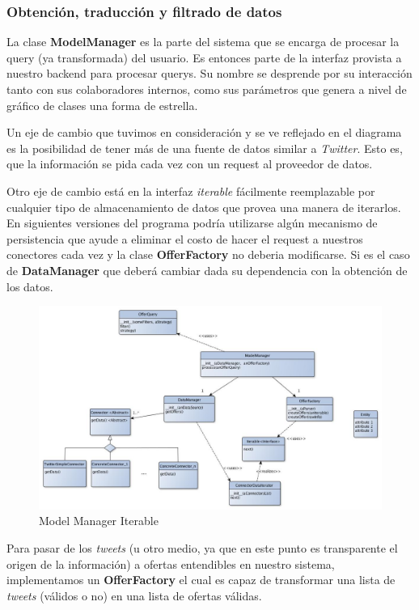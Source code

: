 \documentclass[10pt, a4paper]{article}
\begin{document}
\subsubsection{Obtenci\'on, traducci\'on y filtrado de datos}
La clase \textbf{ModelManager} es la parte del sistema que se encarga de procesar la query (ya transformada) del usuario. Es entonces parte de la interfaz provista a nuestro backend para procesar querys. Su nombre se desprende por su interacción tanto con sus colaboradores internos, como sus parámetros que genera a nivel de gráfico de clases una forma de estrella.

Un eje de cambio que tuvimos en consideración y se ve reflejado en el diagrama es la posibilidad de tener más de una fuente de datos similar a \emph{Twitter}. Esto es, que la informaci\'on se pida cada vez con un request al proveedor de datos.

Otro eje de cambio est\'a en la interfaz \emph{iterable} fácilmente reemplazable por cualquier tipo de almacenamiento de datos que provea una manera de iterarlos. En siguientes versiones del programa podría utilizarse algún mecanismo de persistencia que ayude a eliminar el costo de hacer el request a nuestros conectores cada vez y la clase \textbf{OfferFactory} no deberia modificarse. Si es el caso de \textbf{DataManager} que deberá cambiar dada su dependencia con la obtenci\'on de los datos.

\begin{figure}[H]
\centering
\includegraphics[scale=0.55]{graphics/model_manager_iterable_class.jpg}
\caption{Model Manager Iterable}
\end{figure}



\newpage
Para pasar de los \emph{tweets} (u otro medio, ya que en este punto es transparente el origen de la información) a ofertas entendibles en nuestro sistema, implementamos un \textbf{OfferFactory} el cual es capaz de transformar una lista de \emph{tweets} (válidos o no) en una lista de ofertas válidas.
\end{document}
